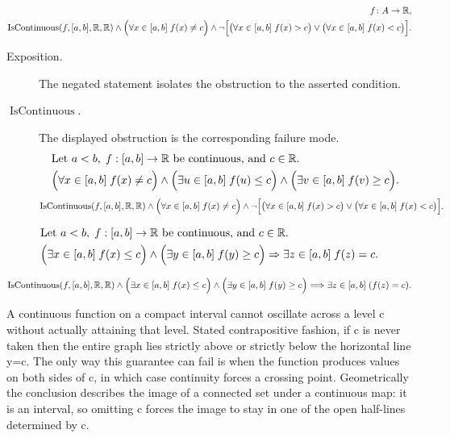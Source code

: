\begin{remark*}
\[
\begin{aligned}
  f\colon A\to\mathbb{R},\\
\operatorname{IsContinuous}(f,[a,b],\mathbb{R},\mathbb{R})
\land
\Bigl(\forall x\in[a,b]\; f(x)\neq c\Bigr)
\land
\neg\Bigl[
\bigl(\forall x\in[a,b]\; f(x)>c\bigr)
\lor
\bigl(\forall x\in[a,b]\; f(x)<c\bigr)
\Bigr].
\end{aligned}
\]
\end{remark*}

\begin{remark*}
\begin{description}
  \item[Exposition.]
  The negated statement isolates the obstruction to the asserted condition.

  \item[\(\operatorname{IsContinuous}.\)]
  The displayed obstruction is the corresponding failure mode.
  \[
\begin{aligned}
&\text{Let } a<b,\; f:[a,b]\to\mathbb{R} \text{ be continuous, and } c\in\mathbb{R}.\\
&\Bigl(\forall x\in[a,b]\; f(x)\neq c\Bigr)
\land
\Bigl(\exists u\in[a,b]\; f(u)\le c\Bigr)
\land
\Bigl(\exists v\in[a,b]\; f(v)\ge c\Bigr).
\end{aligned}
  \]
  \[
\operatorname{IsContinuous}(f,[a,b],\mathbb{R},\mathbb{R})
\land
\Bigl(\forall x\in[a,b]\; f(x)\neq c\Bigr)
\land
\neg\Bigl[
\bigl(\forall x\in[a,b]\; f(x)>c\bigr)
\lor
\bigl(\forall x\in[a,b]\; f(x)<c\bigr)
\Bigr].
  \]
\end{description}
\end{remark*}



\begin{remark*}[Interpretation]
\[
\begin{aligned}
&\text{Let } a<b,\; f:[a,b]\to\mathbb{R} \text{ be continuous, and } c\in\mathbb{R}.\\
&\Bigl(\exists x\in[a,b]\; f(x)\le c\Bigr)
\land
\Bigl(\exists y\in[a,b]\; f(y)\ge c\Bigr)
\Rightarrow
\exists z\in[a,b]\; f(z)=c.
\end{aligned}
\]


\[
\operatorname{IsContinuous}(f,[a,b],\mathbb{R},\mathbb{R})
\land
\Bigl(\exists x\in[a,b]\; f(x)\le c\Bigr)
\land
\Bigl(\exists y\in[a,b]\; f(y)\ge c\Bigr)
\Longrightarrow
\exists z\in[a,b]\;(f(z)=c).
\]


A continuous function on a compact interval cannot oscillate across a level c without actually attaining that level. Stated contrapositive fashion, if c is never taken then the entire graph lies strictly above or strictly below the horizontal line y=c. The only way this guarantee can fail is when the function produces values on both sides of c, in which case continuity forces a crossing point. Geometrically the conclusion describes the image of a connected set under a continuous map: it is an interval, so omitting c forces the image to stay in one of the open half-lines determined by c.
\end{remark*}

